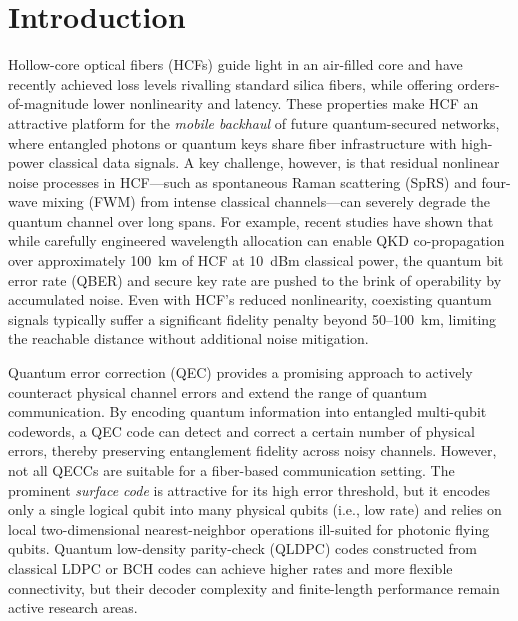 \documentclass[conference]{IEEEtran}  %
\begin{document}
\section{Introduction}
Hollow-core optical fibers (HCFs) guide light in an air-filled core and have recently achieved loss levels rivalling standard silica fibers, while offering orders-of-magnitude lower nonlinearity and latency. These properties make HCF an attractive platform for the \emph{mobile backhaul} of future quantum-secured networks, where entangled photons or quantum keys share fiber infrastructure with high-power classical data signals. A key challenge, however, is that residual nonlinear noise processes in HCF—such as spontaneous Raman scattering (SpRS) and four-wave mixing (FWM) from intense classical channels—can severely degrade the quantum channel over long spans. For example, recent studies have shown that while carefully engineered wavelength allocation can enable QKD co-propagation over approximately 100~km of HCF at 10~dBm classical power, the quantum bit error rate (QBER) and secure key rate are pushed to the brink of operability by accumulated noise. Even with HCF's reduced nonlinearity, coexisting quantum signals typically suffer a significant fidelity penalty beyond 50--100~km, limiting the reachable distance without additional noise mitigation.

Quantum error correction (QEC) provides a promising approach to actively counteract physical channel errors and extend the range of quantum communication. By encoding quantum information into entangled multi-qubit codewords, a QEC code can detect and correct a certain number of physical errors, thereby preserving entanglement fidelity across noisy channels. However, not all QECCs are suitable for a fiber-based communication setting. The prominent \emph{surface code} is attractive for its high error threshold, but it encodes only a single logical qubit into many physical qubits (i.e., low rate) and relies on local two-dimensional nearest-neighbor operations ill-suited for photonic flying qubits. Quantum low-density parity-check (QLDPC) codes constructed from classical LDPC or BCH codes can achieve higher rates and more flexible connectivity, but their decoder complexity and finite-length performance remain active research areas.
\end{document}
